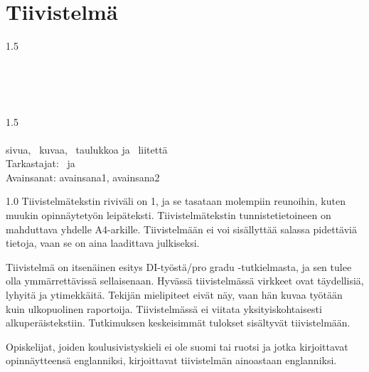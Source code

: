 \section*{Tiivistelmä}
\begin{otherlanguage}{finnish}
	\begin{spacing}{1.5}
		\universityFIN\\
		\schoolFIN\\
		\degreeprogrammeFIN\\
	\end{spacing}

	\myname

	\textbf{\mytitleFIN}\\
	\mysubtitleFIN

	\begin{spacing}{1.5}
		\thesistypeFIN\\
		\thesisyear\\
		\pageref{myLastPage} sivua, \totalfigures~kuvaa, \totaltables~taulukkoa ja ~liitettä\\
		Tarkastajat: \examinerAFIN~ja \examinerBFIN\\
		Avainsanat: avainsana1, avainsana2
	\end{spacing}

	\vspace{1em}
	\begin{spacing}{1.0}
		Tiivistelmätekstin riviväli on 1, ja se tasataan molempiin reunoihin, kuten muukin opinnäytetyön leipäteksti. Tiivistelmätekstin tunnistetietoineen on mahduttava yhdelle A4-arkille. Tiivistelmään ei voi sisällyttää salassa pidettäviä tietoja, vaan se on aina laadittava julkiseksi.

		Tiivistelmä on itsenäinen esitys DI-työstä/pro gradu -tutkielmasta, ja sen tulee olla ymmärrettävissä sellaisenaan. Hyvässä tiivistelmässä virkkeet ovat täydellisiä, lyhyitä ja ytimekkäitä. Tekijän mielipiteet eivät näy, vaan hän kuvaa työtään kuin ulkopuolinen raportoija. Tiivistelmässä ei viitata yksityiskohtaisesti alkuperäistekstiin. Tutkimuksen keskeisimmät tulokset sisältyvät tiivistelmään.

		Opiskelijat, joiden koulusivistyskieli ei ole suomi tai ruotsi ja jotka kirjoittavat opinnäytteensä englanniksi, kirjoittavat tiivistelmän ainoastaan englanniksi.
	\end{spacing}
\end{otherlanguage}
\clearpage %
